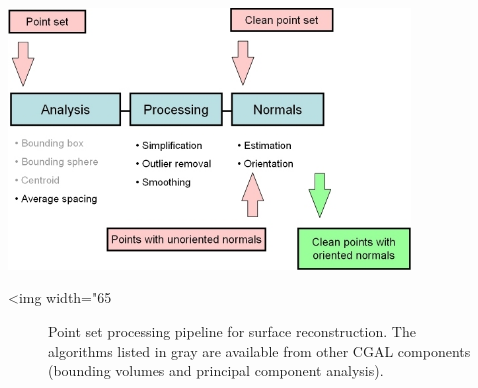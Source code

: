 \begin{center}
    \begin{ccTexOnly}
        \includegraphics[width=0.8\textwidth]{Point_set_processing_3/pipeline} %
    \end{ccTexOnly}
    \begin{ccHtmlOnly}
        <img width="65%
    \end{ccHtmlOnly}
    \begin{figure}[h]
        \caption{Point set processing pipeline for surface reconstruction.
                 The algorithms listed in gray are available from other
                 CGAL components (bounding volumes and principal
                 component analysis).}
        \label{Point_set_processing_3-fig-pipeline}
    \end{figure}
\end{center}


